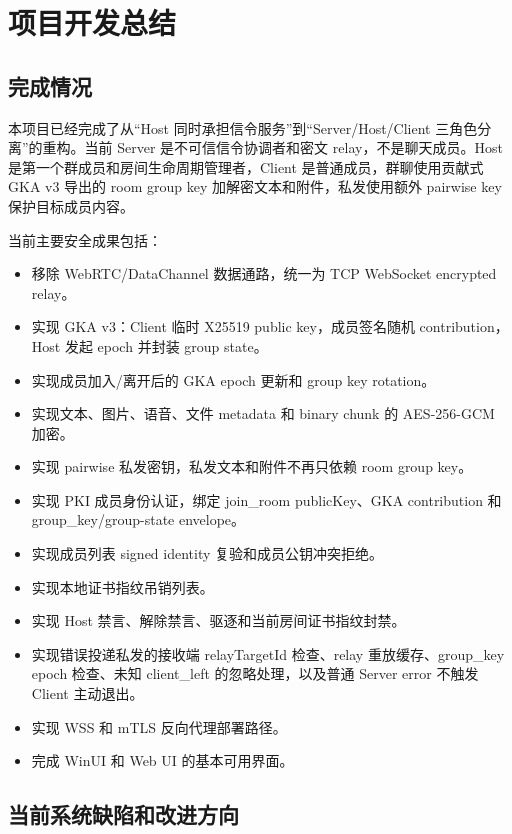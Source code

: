 \documentclass[UTF8,a4paper,12pt]{ctexart}
\begin{document}
\section{项目开发总结}

\subsection{完成情况}

本项目已经完成了从“Host 同时承担信令服务”到“Server/Host/Client 三角色分离”的重构。当前 Server 是不可信信令协调者和密文 relay，不是聊天成员。Host 是第一个群成员和房间生命周期管理者，Client 是普通成员，群聊使用贡献式 GKA v3 导出的 room group key 加解密文本和附件，私发使用额外 pairwise key 保护目标成员内容。

当前主要安全成果包括：

\begin{itemize}
  \item 移除 WebRTC/DataChannel 数据通路，统一为 TCP WebSocket encrypted relay。
  \item 实现 GKA v3：Client 临时 X25519 public key，成员签名随机 contribution，Host 发起 epoch 并封装 group state。
  \item 实现成员加入/离开后的 GKA epoch 更新和 group key rotation。
  \item 实现文本、图片、语音、文件 metadata 和 binary chunk 的 AES-256-GCM 加密。
  \item 实现 pairwise 私发密钥，私发文本和附件不再只依赖 room group key。
  \item 实现 PKI 成员身份认证，绑定 join\_room publicKey、GKA contribution 和 group\_key/group-state envelope。
  \item 实现成员列表 signed identity 复验和成员公钥冲突拒绝。
  \item 实现本地证书指纹吊销列表。
  \item 实现 Host 禁言、解除禁言、驱逐和当前房间证书指纹封禁。
  \item 实现错误投递私发的接收端 relayTargetId 检查、relay 重放缓存、group\_key epoch 检查、未知 client\_left 的忽略处理，以及普通 Server error 不触发 Client 主动退出。
  \item 实现 WSS 和 mTLS 反向代理部署路径。
  \item 完成 WinUI 和 Web UI 的基本可用界面。
\end{itemize}

\subsection{当前系统缺陷和改进方向}
\end{document}
